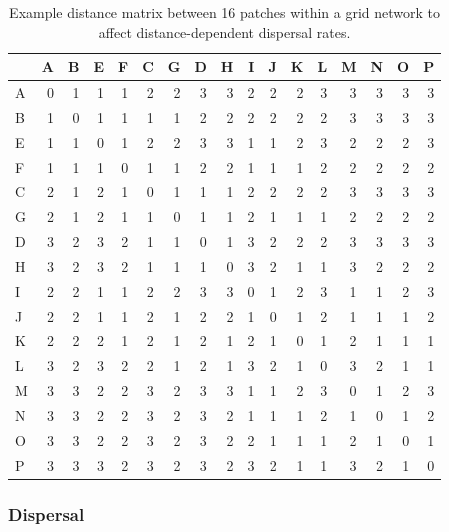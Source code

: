 \documentclass[
]{article}
\begin{document}
\begin{table}

\caption{\label{tab:distance matrix}Example distance matrix between 16 patches within a grid network to affect distance-dependent dispersal rates.}
\centering
\begin{tabular}[t]{lrrrrrrrrrrrrrrrr}
\toprule
  & A & B & E & F & C & G & D & H & I & J & K & L & M & N & O & P\\
\midrule
A & 0 & 1 & 1 & 1 & 2 & 2 & 3 & 3 & 2 & 2 & 2 & 3 & 3 & 3 & 3 & 3\\
B & 1 & 0 & 1 & 1 & 1 & 1 & 2 & 2 & 2 & 2 & 2 & 2 & 3 & 3 & 3 & 3\\
E & 1 & 1 & 0 & 1 & 2 & 2 & 3 & 3 & 1 & 1 & 2 & 3 & 2 & 2 & 2 & 3\\
F & 1 & 1 & 1 & 0 & 1 & 1 & 2 & 2 & 1 & 1 & 1 & 2 & 2 & 2 & 2 & 2\\
C & 2 & 1 & 2 & 1 & 0 & 1 & 1 & 1 & 2 & 2 & 2 & 2 & 3 & 3 & 3 & 3\\
\addlinespace
G & 2 & 1 & 2 & 1 & 1 & 0 & 1 & 1 & 2 & 1 & 1 & 1 & 2 & 2 & 2 & 2\\
D & 3 & 2 & 3 & 2 & 1 & 1 & 0 & 1 & 3 & 2 & 2 & 2 & 3 & 3 & 3 & 3\\
H & 3 & 2 & 3 & 2 & 1 & 1 & 1 & 0 & 3 & 2 & 1 & 1 & 3 & 2 & 2 & 2\\
I & 2 & 2 & 1 & 1 & 2 & 2 & 3 & 3 & 0 & 1 & 2 & 3 & 1 & 1 & 2 & 3\\
J & 2 & 2 & 1 & 1 & 2 & 1 & 2 & 2 & 1 & 0 & 1 & 2 & 1 & 1 & 1 & 2\\
\addlinespace
K & 2 & 2 & 2 & 1 & 2 & 1 & 2 & 1 & 2 & 1 & 0 & 1 & 2 & 1 & 1 & 1\\
L & 3 & 2 & 3 & 2 & 2 & 1 & 2 & 1 & 3 & 2 & 1 & 0 & 3 & 2 & 1 & 1\\
M & 3 & 3 & 2 & 2 & 3 & 2 & 3 & 3 & 1 & 1 & 2 & 3 & 0 & 1 & 2 & 3\\
N & 3 & 3 & 2 & 2 & 3 & 2 & 3 & 2 & 1 & 1 & 1 & 2 & 1 & 0 & 1 & 2\\
O & 3 & 3 & 2 & 2 & 3 & 2 & 3 & 2 & 2 & 1 & 1 & 1 & 2 & 1 & 0 & 1\\
\addlinespace
P & 3 & 3 & 3 & 2 & 3 & 2 & 3 & 2 & 3 & 2 & 1 & 1 & 3 & 2 & 1 & 0\\
\bottomrule
\end{tabular}
\end{table}

\hypertarget{dispersal}{%
\subsubsection{Dispersal}\label{dispersal}}
\end{document}

